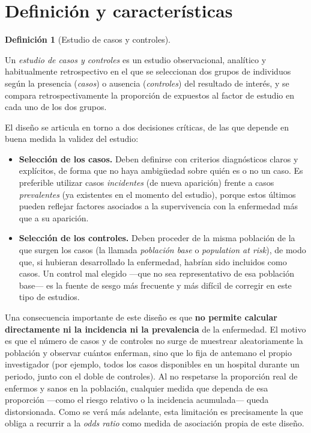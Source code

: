 \documentclass[
  spanish,
  a4paper,
]{scrreport}
\providecommand{\tightlist}{%
  \setlength{\itemsep}{0pt}\setlength{\parskip}{0pt}}
\theoremstyle{definition}
\theoremstyle{definition}
\newtheorem{definition}{Definición}[chapter]
\theoremstyle{remark}
\begin{document}
\section{Definición y
características}\label{definiciuxf3n-y-caracteruxedsticas-3}

\begin{definition}[Estudio de casos y
controles]\protect\hypertarget{def-casoscontroles-estudio-casos-controles}{}\label{def-casoscontroles-estudio-casos-controles}

Un \emph{estudio de casos y controles} es un estudio observacional,
analítico y habitualmente retrospectivo en el que se seleccionan dos
grupos de individuos según la presencia (\emph{casos}) o ausencia
(\emph{controles}) del resultado de interés, y se compara
retrospectivamente la proporción de expuestos al factor de estudio en
cada uno de los dos grupos.

\end{definition}

El diseño se articula en torno a dos decisiones críticas, de las que
depende en buena medida la validez del estudio:

\begin{itemize}
\tightlist
\item
  \textbf{Selección de los casos.} Deben definirse con criterios
  diagnósticos claros y explícitos, de forma que no haya ambigüedad
  sobre quién es o no un caso. Es preferible utilizar casos
  \emph{incidentes} (de nueva aparición) frente a casos
  \emph{prevalentes} (ya existentes en el momento del estudio), porque
  estos últimos pueden reflejar factores asociados a la supervivencia
  con la enfermedad más que a su aparición.
\item
  \textbf{Selección de los controles.} Deben proceder de la misma
  población de la que surgen los casos (la llamada \emph{población base}
  o \emph{population at risk}), de modo que, si hubieran desarrollado la
  enfermedad, habrían sido incluidos como casos. Un control mal elegido
  ---que no sea representativo de esa población base--- es la fuente de
  sesgo más frecuente y más difícil de corregir en este tipo de
  estudios.
\end{itemize}

Una consecuencia importante de este diseño es que \textbf{no permite
calcular directamente ni la incidencia ni la prevalencia} de la
enfermedad. El motivo es que el número de casos y de controles no surge
de muestrear aleatoriamente la población y observar cuántos enferman,
sino que lo fija de antemano el propio investigador (por ejemplo, todos
los casos disponibles en un hospital durante un periodo, junto con el
doble de controles). Al no respetarse la proporción real de enfermos y
sanos en la población, cualquier medida que dependa de esa proporción
---como el riesgo relativo o la incidencia acumulada--- queda
distorsionada. Como se verá más adelante, esta limitación es
precisamente la que obliga a recurrir a la \emph{odds ratio} como medida
de asociación propia de este diseño.
\end{document}
